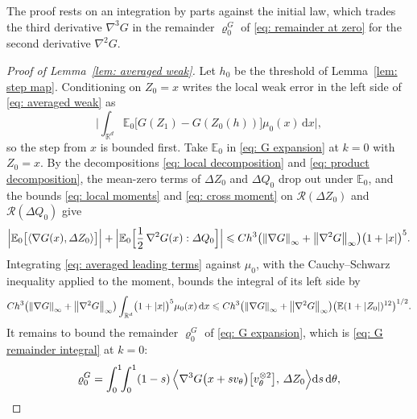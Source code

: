 \documentclass[namedate,webpdf,imanum]{ima-authoring-template}
\newcommand{\Le}{\leqslant}
\newcommand{\D}{\mathrm{d}}
\theoremstyle{thmstyletwo}
\numberwithin{equation}{section}
\begin{document}
The proof rests on an integration by parts against the initial law, which trades the third derivative $\nabla^3 G$ in the remainder $\varrho_0^G$ of \eqref{eq: remainder at zero} for the second derivative $\nabla^2 G$.

\begin{proof}[Proof of Lemma~\ref{lem: averaged weak}]
    Let $h_0$ be the threshold of Lemma~\ref{lem: step map}. Conditioning on $Z_0 = x$ writes the local weak error in the left side of \eqref{eq: averaged weak} as
    \begin{equation}
        \biggl| \int_{\mathbb R^d} \mathbb E_0 \bigl[ G(Z_1) - G(Z_0(h)) \bigr] \mu_0(x)\,\D x \biggr| ,
        \label{eq: averaged left side}
    \end{equation}
    so the step from $x$ is bounded first. Take $\mathbb E_0$ in \eqref{eq: G expansion} at $k = 0$ with $Z_0 = x$. By the decompositions \eqref{eq: local decomposition} and \eqref{eq: product decomposition}, the mean-zero terms of $\Delta Z_0$ and $\Delta Q_0$ drop out under $\mathbb E_0$, and the bounds \eqref{eq: local moments} and \eqref{eq: cross moment} on $\mathcal R(\Delta Z_0)$ and $\mathcal R(\Delta Q_0)$ give
    \begin{equation}
        \Bigl| \mathbb E_0 \bigl[ \langle \nabla G(x), \Delta Z_0 \rangle \bigr] \Bigr|
        + \Bigl| \mathbb E_0 \Bigl[ \frac12\, \nabla^2 G(x) : \Delta Q_0 \Bigr] \Bigr|
        \Le C h^3 \bigl( \norm{\nabla G}_\infty + \norm{\nabla^2 G}_\infty \bigr) \bigl( 1 + |x| \bigr)^5 .
        \label{eq: averaged leading terms}
    \end{equation}
    Integrating \eqref{eq: averaged leading terms} against $\mu_0$, with the Cauchy--Schwarz inequality applied to the moment, bounds the integral of its left side by
    \begin{equation}
        C h^3 \bigl( \norm{\nabla G}_\infty + \norm{\nabla^2 G}_\infty \bigr) \int_{\mathbb R^d} \bigl( 1 + |x| \bigr)^5 \mu_0(x)\,\D x
        \Le C h^3 \bigl( \norm{\nabla G}_\infty + \norm{\nabla^2 G}_\infty \bigr) \bigl( \mathbb E ( 1 + |Z_0| )^{12} \bigr)^{1/2} .
        \label{eq: averaged leading integrated}
    \end{equation}
    It remains to bound the remainder $\varrho_0^G$ of \eqref{eq: G expansion}, which is \eqref{eq: G remainder integral} at $k = 0$:
    \begin{equation}
        \varrho_0^G = \int_0^1 \!\! \int_0^1 (1 - s)\, \Bigl\langle \nabla^3 G\bigl( x + s v_\theta \bigr) \bigl[ v_\theta^{\otimes 2} \bigr] ,\, \Delta Z_0 \Bigr\rangle \D s\,\D\theta ,

\end{equation}
\end{proof}
\end{document}
